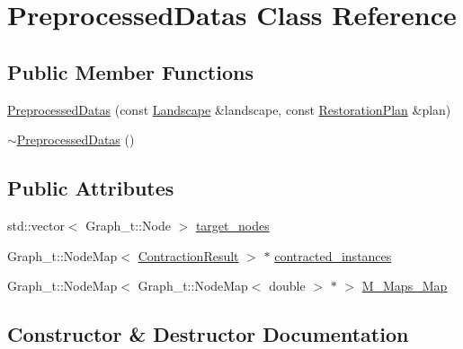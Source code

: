 \hypertarget{class_preprocessed_datas}{}\section{Preprocessed\+Datas Class Reference}
\label{class_preprocessed_datas}
\subsection*{Public Member Functions}
\begin{DoxyCompactItemize}
\item 
\hyperlink{class_preprocessed_datas_a5a2b24d907af973230fb67aee307dd64}{Preprocessed\+Datas} (const \hyperlink{class_landscape}{Landscape} \&landscape, const \hyperlink{class_restoration_plan}{Restoration\+Plan} \&plan)
\item 
\hyperlink{class_preprocessed_datas_a9bb50e07b35810a18b2a1890b5e456c1}{$\sim$\+Preprocessed\+Datas} ()
\end{DoxyCompactItemize}
\subsection*{Public Attributes}
\begin{DoxyCompactItemize}
\item 
std\+::vector$<$ Graph\+\_\+t\+::\+Node $>$ \hyperlink{class_preprocessed_datas_af9a7df9ec408a8a1be2daa954bc39826}{target\+\_\+nodes}
\item 
Graph\+\_\+t\+::\+Node\+Map$<$ \hyperlink{class_contraction_result}{Contraction\+Result} $>$ $\ast$ \hyperlink{class_preprocessed_datas_ab5f37f8788618675ab08bb46f8e5ac81}{contracted\+\_\+instances}
\item 
Graph\+\_\+t\+::\+Node\+Map$<$ Graph\+\_\+t\+::\+Node\+Map$<$ double $>$ $\ast$ $>$ \hyperlink{class_preprocessed_datas_aa8a3dc93b539bbc1291e03d2904fe4f3}{M\+\_\+\+Maps\+\_\+\+Map}
\end{DoxyCompactItemize}


\subsection{Constructor \& Destructor Documentation}
\mbox{\label{class_preprocessed_datas_a5a2b24d907af973230fb67aee307dd64}} 
